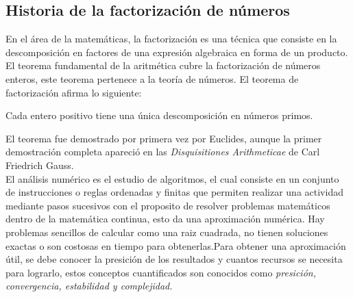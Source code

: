 \subsection{Historia de la factorización de números}
En el área de la matemáticas, la factorización es una técnica que consiste en la descomposición en factores de una expresión algebraica
en forma de un producto. El teorema fundamental de la aritmética cubre la factorización de números enteros, este teorema pertenece a la teoría
de números. El teorema de factorización afirma lo siguiente:
\begin{teor}
    Cada entero positivo tiene una única descomposición en números primos.
    \label{teo:enterosprimos}
\end{teor}
El teorema fue demostrado por primera vez por Euclides, aunque la primer demostración completa apareció en las \textit{Disquisitiones Arithmeticae}
de Carl Friedrich Gauss.\\
El análisis numérico es el estudio de algoritmos, el cual consiste en un conjunto de instrucciones o reglas ordenadas y finitas que permiten
realizar una actividad mediante pasos sucesivos con el proposito de resolver problemas matemáticos dentro de la matemática continua, esto da 
una aproximación numérica. Hay problemas sencillos de calcular como una raiz cuadrada, no tienen soluciones exactas o son costosas en tiempo
para obtenerlas.Para obtener una aproximación útil, se debe conocer la presición de los resultados y cuantos recursos se necesita para lograrlo, estos conceptos
cuantificados son conocidos como \textit{presición, convergencia, estabilidad y complejidad.}\\

